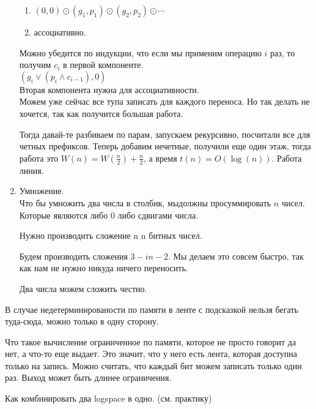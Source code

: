 \begin{exmp}
\begin{enumerate}
\begin{enumerate}
\item $(0, 0) \odot (g_1, p_1) \odot (g_2, p_2) \odot \cdots$
\item ассоциативно. 
\end{enumerate}

Можно убедится по индукции, что если мы применим операцию $i$ раз, то получим $c_i$ в первой компоненте.\\
$(g_i \vee (p_i \wedge c_{i - 1}), 0)$\\
Вторая компонента нужна для ассоциативности.\\

Можем уже сейчас все тупа записать для каждого переноса. Но так делать не хочется, 
так как получится большая работа. 

Тогда давай-те разбиваем по парам, запускаем рекурсивно, посчитали все для 
четных префиксов. Теперь добавим нечетные, получили еще один этаж, тогда
работа это $W(n) = W(\frac{n}{2}) + \frac{n}{2}$, а время $t(n) = O(\log (n))$. 
Работа линия.

\item Умножение.\\ 
Что бы умножить два числа в столбик, мыдолжны просуммировать $n$ чисел. Которые
являются либо 0 либо сдвигами числа. 

Нужно производить сложение n n битных чисел. 

Будем производить сложения $3-in-2$.
Мы делаем это совсем быстро, так как нам не нужно никуда ничего переносить.

Два числа можем сложить честно.
\end{enumerate}
\end{exmp}
\begin{Rem}
В случае недетерминированости по памяти
в ленте с подсказкой нельзя бегать туда-сюда, можно только в одну сторону.
\end{Rem}
\begin{Rem}
Что такое вычисление ограниченное по памяти, которое не просто 
говорит да нет, а что-то еще выдает. Это значит, что у него 
есть лента, которая доступна только на запись. Можно считать, 
что каждый бит можем записать только один раз. Выход может быть длинее
ограничения. 
\end{Rem}
Как комбинировать два logspace в одно. (см. практику) 

